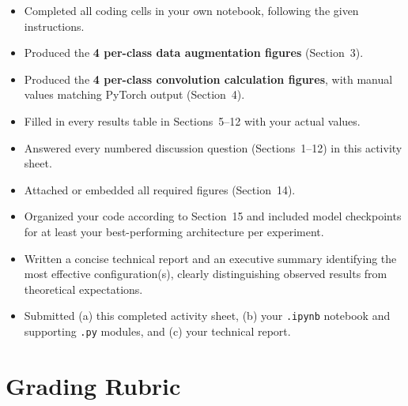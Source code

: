 \documentclass[12pt,a4paper]{article}
\begin{document}
\begin{itemize}[leftmargin=2em, label=$\square$]
  \item Completed all coding cells in your own notebook, following the given instructions.
  \item Produced the \textbf{4 per-class data augmentation figures} (Section~3).
  \item Produced the \textbf{4 per-class convolution calculation figures}, with manual
        values matching PyTorch output (Section~4).
  \item Filled in every results table in Sections~5--12 with your actual values.
  \item Answered every numbered discussion question (Sections~1--12) in this activity sheet.
  \item Attached or embedded all required figures (Section~14).
  \item Organized your code according to Section~15 and included model checkpoints for
        at least your best-performing architecture per experiment.
  \item Written a concise technical report and an executive summary identifying the
        most effective configuration(s), clearly distinguishing observed results from
        theoretical expectations.
  \item Submitted (a) this completed activity sheet, (b) your \texttt{.ipynb} notebook
        and supporting \texttt{.py} modules, and (c) your technical report.
\end{itemize}

\section*{Grading Rubric}
\end{document}
